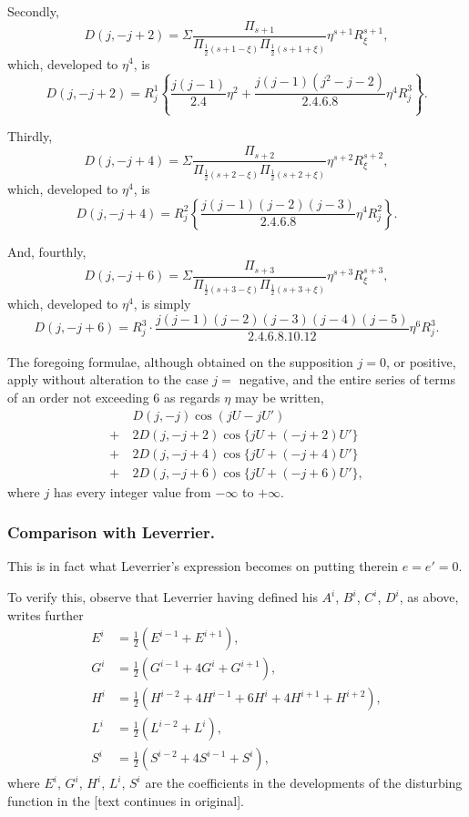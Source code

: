 \documentclass[11pt,a4paper]{article}
\begin{document}
Secondly,
\[
D(j, -j+2) = \Sigma \frac{\Pi_{s+1}}{\Pi_{\frac{1}{2}(s+1-\xi)} \Pi_{\frac{1}{2}(s+1+\xi)}} \eta^{s+1} R_{\xi}^{s+1},
\]
which, developed to $\eta^{4}$, is
\[\tag{*$j+j'=2$}
D(j, -j+2) = R_{j}^{1} \left\{ \frac{j(j-1)}{2.4} \eta^{2} + \frac{j(j-1)(j^{2}-j-2)}{2.4.6.8} \eta^{4} R_{j}^{3} \right\}.
\]

Thirdly,
\[
D(j, -j+4) = \Sigma \frac{\Pi_{s+2}}{\Pi_{\frac{1}{2}(s+2-\xi)} \Pi_{\frac{1}{2}(s+2+\xi)}} \eta^{s+2} R_{\xi}^{s+2},
\]
which, developed to $\eta^{4}$, is
\[\tag{*$j+j'=4$}
D(j, -j+4) = R_{j}^{2} \left\{ \frac{j(j-1)(j-2)(j-3)}{2.4.6.8} \eta^{4} R_{j}^{2} \right\}.
\]

And, fourthly,
\[
D(j, -j+6) = \Sigma \frac{\Pi_{s+3}}{\Pi_{\frac{1}{2}(s+3-\xi)} \Pi_{\frac{1}{2}(s+3+\xi)}} \eta^{s+3} R_{\xi}^{s+3},
\]
which, developed to $\eta^{4}$, is simply
\[\tag{*$j+j'=6$}
D(j, -j+6) = R_{j}^{3} \cdot \frac{j(j-1)(j-2)(j-3)(j-4)(j-5)}{2.4.6.8.10.12} \eta^{6} R_{j}^{3}.
\]

The foregoing formulae, although obtained on the supposition $j = 0$, or positive, apply without alteration to the case $j =$ negative, and the entire series of terms of an order not exceeding 6 as regards $\eta$ may be written,
\begin{align*}
& D(j, -j) \cos(jU - jU') \\
+\ & 2D(j, -j+2) \cos\{jU + (-j+2)U'\} \\
+\ & 2D(j, -j+4) \cos\{jU + (-j+4)U'\} \\
+\ & 2D(j, -j+6) \cos\{jU + (-j+6)U'\},
\end{align*}
where $j$ has every integer value from $-\infty$ to $+\infty$.

\subsubsection*{Comparison with Leverrier.}

This is in fact what Leverrier's expression becomes on putting therein $e = e' = 0$.

To verify this, observe that Leverrier having defined his $A^{i}$, $B^{i}$, $C^{i}$, $D^{i}$, as above, writes further
\begin{align*}
E^{i} &= \tfrac{1}{2}(E^{i-1} + E^{i+1}), \\
G^{i} &= \tfrac{1}{2}(G^{i-1} + 4G^{i} + G^{i+1}), \\
H^{i} &= \tfrac{1}{2}(H^{i-2} + 4H^{i-1} + 6H^{i} + 4H^{i+1} + H^{i+2}), \\
L^{i} &= \tfrac{1}{2}(L^{i-2} + L^{i}), \\
S^{i} &= \tfrac{1}{2}(S^{i-2} + 4S^{i-1} + S^{i}),
\end{align*}
where $E^{i}$, $G^{i}$, $H^{i}$, $L^{i}$, $S^{i}$ are the coefficients in the developments of the disturbing function in the [text continues in original].
\end{document}
